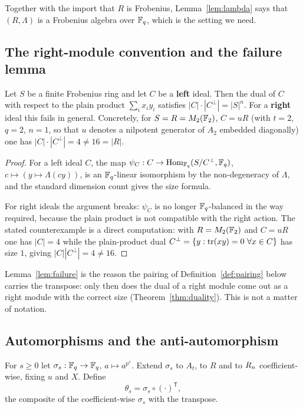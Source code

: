 Together with the import that $R$ is Frobenius, Lemma~\ref{lem:lambda} says that
$(R,\Lambda)$ is a Frobenius algebra over $\mathbb F_q$, which is the setting we need.

\subsection{The right-module convention and the failure lemma}

\begin{lemma}\label{lem:failure}
Let $S$ be a finite Frobenius ring and let
$C$ be a \textbf{left} ideal. Then the dual of $C$ with respect to the plain
product $\sum_ix_iy_i$ satisfies $|C|\cdot|C^{\perp}|=|S|^n$. For a
\textbf{right} ideal this fails in general. Concretely, for
$S=R=M_2(\mathbb F_2)$, $C=uR$ (with $t=2$, $q=2$, $n=1$, so that $u$ denotes a
nilpotent generator of $A_2$ embedded diagonally) one has
$|C|\cdot|C^{\perp}|=4\ne16=|R|$.
\end{lemma}

\begin{proof}
For a left ideal $C$, the map
$\psi_C:C\to\operatorname{Hom}_{\mathbb F_q}(S/C^{\perp},\mathbb F_q)$, $c\mapsto(y\mapsto\Lambda(cy))$, is
an $\mathbb F_q$-linear isomorphism by the non-degeneracy of $\Lambda$, and the
standard dimension count gives the size formula.

For right ideals the argument breaks: $\psi_C$ is no longer $\mathbb F_q$-balanced in
the way required, because the plain product is not compatible with the
right action. The stated counterexample is a direct computation: with
$R=M_2(\mathbb F_2)$ and $C=uR$ one has $|C|=4$ while the plain-product dual
$C^{\perp}=\{y:\operatorname{tr}(xy)=0\ \forall x\in C\}$ has size $1$, giving
$|C||C^{\perp}|=4\ne 16$.
\end{proof}

\begin{remark}\label{rem:convention}
Lemma~\ref{lem:failure} is the reason the pairing of
Definition~\ref{def:pairing} below carries the transpose: only then does the
dual of a right module come out as a right module with the correct size
(Theorem~\ref{thm:duality}). This is not a matter of notation.
\end{remark}

\subsection{Automorphisms and the anti-automorphism}

\begin{definition}\label{def:sigma}
For $s\ge0$ let $\sigma_s:\mathbb F_q\to\mathbb F_q$, $a\mapsto a^{p^s}$. Extend $\sigma_s$
to $A_t$, to $R$ and to $R_n$ coefficient-wise, fixing $u$ and $X$. Define
\begin{equation}\label{eq:theta}
  \theta_s=\sigma_s\circ(\cdot)^{\mathsf T},
\end{equation}
the composite of the coefficient-wise $\sigma_s$ with the transpose.
\end{definition}

